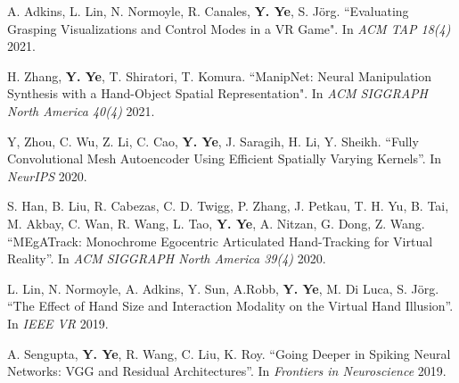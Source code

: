 \documentclass[margin,line]{res}
\begin{document}
\begin{resume}
\vspace*{-.1in}
A. Adkins, L. Lin, N. Normoyle, R. Canales, {\bf Y. Ye}, S. J\"{o}rg. ``Evaluating Grasping Visualizations and Control Modes in a VR Game". In {\em ACM TAP 18(4)} 2021.

\vspace*{-.1in}
H. Zhang, {\bf Y. Ye}, T. Shiratori, T. Komura. ``ManipNet: Neural Manipulation Synthesis with a Hand-Object Spatial Representation". In {\em ACM SIGGRAPH North America 40(4)} 2021.

\vspace*{-.1in}
Y, Zhou, C. Wu, Z. Li, C. Cao, {\bf Y. Ye}, J. Saragih, H. Li, Y. Sheikh. ``Fully Convolutional Mesh Autoencoder Using Efficient Spatially Varying Kernels''. In {\em NeurIPS} 2020.

\vspace*{-.1in}
S. Han, B. Liu, R. Cabezas, C. D. Twigg, P. Zhang, J. Petkau, T. H. Yu, B. Tai, M. Akbay, C. Wan, R. Wang, L. Tao, {\bf Y. Ye}, A. Nitzan, G. Dong, Z. Wang. ``MEgATrack: Monochrome Egocentric Articulated Hand-Tracking for Virtual Reality''. In {\em ACM SIGGRAPH North America 39(4)} 2020.




\vspace*{-.1in}
L. Lin, N. Normoyle, A. Adkins, Y. Sun, A.Robb, {\bf Y. Ye}, M. Di Luca, S. J\"{o}rg. ``The Effect of Hand Size and Interaction Modality on the Virtual Hand Illusion''. In {\em IEEE VR} 2019.


\vspace*{-.1in}
A. Sengupta, {\bf Y. Ye}, R. Wang, C. Liu, K. Roy. ``Going Deeper in Spiking Neural Networks: VGG and Residual Architectures''. In {\em Frontiers in Neuroscience} 2019.


\end{resume}
\end{document}
